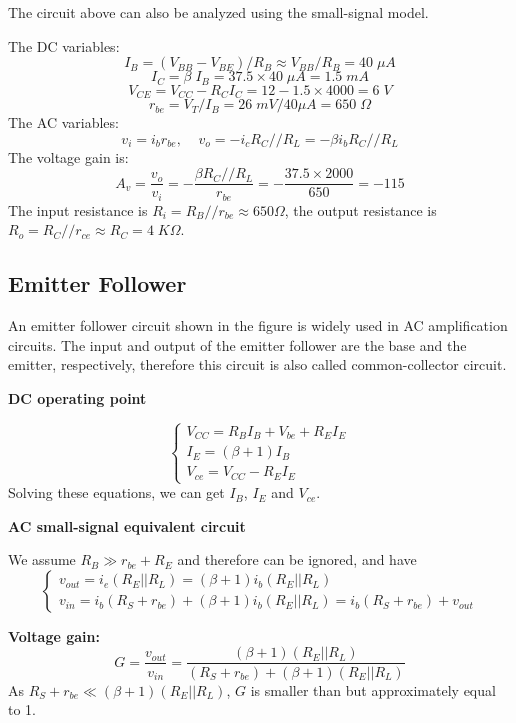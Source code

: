 The circuit above can also be analyzed using the small-signal model. 

The DC variables:
\[	I_B=(V_{BB}-V_{BE})/R_B \approx V_{BB}/R_B=40 \;\mu A	\]
\[	I_C=\beta\;I_B=37.5\times 40\;\mu A=1.5\;mA	\]
\[	V_{CE}=V_{CC}-R_C I_C=12-1.5\times 4000=6\;V	\]
\[	r_{be}=V_T/I_B=26\;mV/40\mu A=650 \;\Omega	\]
The AC variables:
\[	v_i=i_b r_{be}, \;\;\;\;v_o=-i_c R_C//R_L=-\beta i_b R_C//R_L	\]
The voltage gain is:
\[	A_v=\frac{v_o}{v_i}=-\frac{\beta R_C//R_L}{r_{be}}
	=-\frac{37.5\times 2000}{650}=-115	\]
The input resistance is $R_i=R_B//r_{be}\approx 650 \Omega$, the output 
resistance is $R_o=R_C//r_{ce}\approx R_C=4\;K\Omega$.

\subsection*{Emitter Follower}

An emitter follower circuit shown in the figure is widely used in AC 
amplification circuits. The input and output of the emitter follower are
the base and the emitter, respectively, therefore this circuit is also
called common-collector circuit.



{\bf DC operating point}

\[ \left\{ \begin{array}{l} V_{CC}=R_B I_B+V_{be}+R_E I_E	\\
	I_E=(\beta+1) I_B	\\
	V_{ce}=V_{CC}-R_E I_E \end{array} \right. \]
Solving these equations, we can get $I_B$, $I_E$ and $V_{ce}$.

{\bf AC small-signal equivalent circuit}


We assume $R_B \gg r_{be}+R_E$ and therefore can be ignored, and have
\[ \left\{ \begin{array}{l} 
	v_{out}=i_e (R_E||R_L)=(\beta+1) i_b (R_E||R_L) 	\\
	v_{in}=i_b (R_S+r_{be})+(\beta+1) i_b (R_E||R_L)=i_b (R_S+r_{be})+v_{out}
\end{array} \right. \]

{\bf Voltage gain:}
\[	G=\frac{v_{out}}{v_{in}}
	=\frac{(\beta+1) (R_E||R_L)}{(R_S+r_{be})+(\beta+1) (R_E||R_L)} 
\]
As $R_S+r_{be} \ll (\beta+1) (R_E||R_L)$, $G$ is smaller than but approximately
equal to 1.

